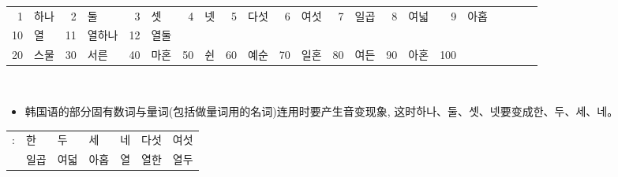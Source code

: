 \section{\kr {}}
\begin{grammar}
	\begin{grammarsect}[韩国语的固有数词]
		\\
		{\kr \begin{tabular}{rlrlrlrlrlrlrlrlrlrlrl}
			1  & 하나 & 2  & 둘   & 3  & 셋  & 4  & 넷 & 5  & 다섯 & 6  & 여섯 & 7  & 일곱 & 8  & 여넓 & 9   & 아홉          \\
			10 & 열  & 11 & 열하나 & 12 & 열둘                                                                      \\
			20 & 스물 & 30 & 서른  & 40 & 마혼 & 50 & 쉰 & 60 & 예순 & 70 & 일혼 & 80 & 여든 & 90 & 아혼 & 100 & \ruby{百}{백}
		\end{tabular}}\\
		\begin{itemize}
			\item 韩国语的部分固有数词与量词(包括做量词用的名词)连用时要产生音变现象, 这时{\kr 하나、둘、셋、넷}要变成{\kr 한、두、세、네}。
		\end{itemize}
		\begin{tabular}{ll|ll|lll}
			\kr \ruby{例}{예}: &\kr  한 \ruby{時}{시}  & \kr 두 \ruby{時}{시}  & \kr 세 \ruby{時}{시}  & \kr 네 \ruby{時}{시} & \kr 다섯 \ruby{時}{시} & \kr 여섯 \ruby{時}{시} \\
			             & \kr 일곱 \ruby{時}{시} & \kr 여덟 \ruby{時}{시} & \kr 아홉 \ruby{時}{시} & \kr 열 \ruby{時}{시} & \kr 열한 \ruby{時}{시} & \kr 열두 \ruby{時}{시} \\
		\end{tabular}\\
	\end{grammarsect}
\end{grammar}
